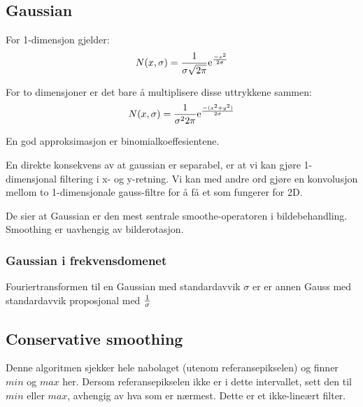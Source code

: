 \subsection{Gaussian}
For 1-dimensjon gjelder:
\begin{equation}
    N(x, \sigma) = {1 \over \sigma\sqrt{2\pi}}\mathrm{e}^{-x^{2} \over 2\sigma}
\end{equation}

For to dimensjoner er det bare å multiplisere disse uttrykkene sammen:
\begin{equation}
    N(x, \sigma) = {1 \over \sigma^{2}2\pi}\mathrm{e}^{-({x^{2} + y^2}) \over 2\sigma}
\end{equation}

En god approksimasjon er binomialkoeffesientene.

En direkte konsekvens av at gaussian er separabel, er at vi kan gjøre 1-dimensjonal filtering i x- og y-retning. Vi kan med andre ord gjøre en konvolusjon mellom to 1-dimensjonale gauss-filtre for å få et som fungerer for 2D.

De sier at Gaussian er den mest sentrale smoothe-operatoren i bildebehandling. Smoothing er uavhengig av bilderotasjon.

\subsubsection{Gaussian i frekvensdomenet}
Fouriertransformen til en Gaussian med standardavvik $\sigma$ er er annen Gauss med standardavvik proposjonal med ${1 \over \sigma}$

\subsection{Conservative smoothing}
Denne algoritmen sjekker hele nabolaget (utenom referansepikselen) og finner $min$ og $max$ her. Dersom referansepikselen ikke er i dette intervallet, sett den til $min$ eller $max$, avhengig av hva som er nærmest. Dette er et ikke-lineært filter.

